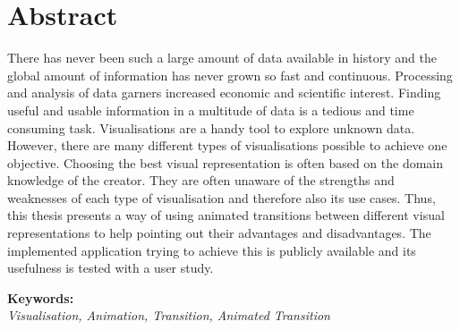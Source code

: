 \section*{Abstract}

There has never been such a large amount of data available in history and the global amount of information has never grown so fast and continuous. Processing and analysis of data garners increased economic and scientific interest. Finding useful and usable information in a multitude of data is a tedious and time consuming task. Visualisations are a handy tool to explore unknown data. However, there are many different types of visualisations possible to achieve one objective. Choosing the best visual representation is often based on the domain knowledge of the creator. They are often unaware of the strengths and weaknesses of each type of visualisation and therefore also its use cases. Thus, this thesis presents a way of using animated transitions between different visual representations to help pointing out their advantages and disadvantages. The implemented application trying to achieve this is publicly available and its usefulness is tested with a user study.


\textbf{Keywords:}\\
\textit{Visualisation, Animation, Transition, Animated Transition}